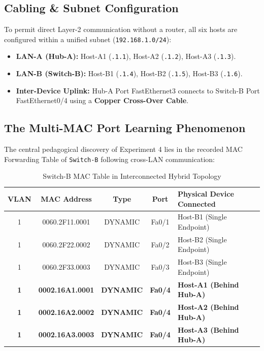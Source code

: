 \documentclass[12pt, a4paper]{article}
\begin{document}
\subsection{Cabling \& Subnet Configuration}
To permit direct Layer-2 communication without a router, all six hosts are configured within a unified subnet (\texttt{192.168.1.0/24}):
\begin{itemize}
    \item \textbf{LAN-A (Hub-A):} Host-A1 (\texttt{.1.1}), Host-A2 (\texttt{.1.2}), Host-A3 (\texttt{.1.3}).
    \item \textbf{LAN-B (Switch-B):} Host-B1 (\texttt{.1.4}), Host-B2 (\texttt{.1.5}), Host-B3 (\texttt{.1.6}).
    \item \textbf{Inter-Device Uplink:} Hub-A Port FastEthernet3 connects to Switch-B Port FastEthernet0/4 using a \textbf{Copper Cross-Over Cable}.
\end{itemize}

\subsection{The Multi-MAC Port Learning Phenomenon}
The central pedagogical discovery of Experiment 4 lies in the recorded MAC Forwarding Table of \texttt{Switch-B} following cross-LAN communication:

\begin{table}[H]
\centering
\caption{Switch-B MAC Table in Interconnected Hybrid Topology}
\label{tab:prob4_cam}
\begin{tabular}{ccccp{5cm}}
\toprule
\textbf{VLAN} & \textbf{MAC Address} & \textbf{Type} & \textbf{Port} & \textbf{Physical Device Connected} \\
\midrule
1 & 0060.2F11.0001 & DYNAMIC & Fa0/1 & Host-B1 (Single Endpoint) \\
1 & 0060.2F22.0002 & DYNAMIC & Fa0/2 & Host-B2 (Single Endpoint) \\
1 & 0060.2F33.0003 & DYNAMIC & Fa0/3 & Host-B3 (Single Endpoint) \\
\midrule
\textbf{1} & \textbf{0002.16A1.0001} & \textbf{DYNAMIC} & \textbf{Fa0/4} & \textbf{Host-A1 (Behind Hub-A)} \\
\textbf{1} & \textbf{0002.16A2.0002} & \textbf{DYNAMIC} & \textbf{Fa0/4} & \textbf{Host-A2 (Behind Hub-A)} \\
\textbf{1} & \textbf{0002.16A3.0003} & \textbf{DYNAMIC} & \textbf{Fa0/4} & \textbf{Host-A3 (Behind Hub-A)} \\
\bottomrule
\end{tabular}
\end{table}
\end{document}
